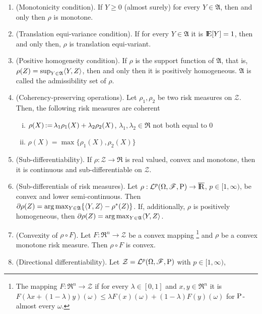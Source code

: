 \documentclass[a4paper,10pt]{article}
\begin{document}
\begin{enumerate}
 \item (Monotonicity condition). If $Y\geq 0$ (almost surely) for every $Y\in \mathfrak{A}$, 
       then and only then $\rho$ is monotone.
       
 \item (Translation equi-variance condition). If for every $Y\in\mathfrak{A}$ it is $\E[Y]=1$,
       then and only then, $\rho$ is translation equi-variant.
       
 \item (Positive homogeneity condition). If $\rho$ is the support function of $\mathfrak{A}$, 
       that is, $\rho(Z) = \sup_{Y\in\mathfrak{A}}\langle Y,Z\rangle$, then and only then it is positively homogeneous.
       $\mathfrak{A}$ is called the admissibility set of $\rho$.
       
 \item (Coherency-preserving operations). Let $\rho_1,\rho_2$ be two risk measures on $\mathcal{Z}$.
       Then, the following risk measures are coherent
       \begin{enumerate}[i.]
        \item $\rho(X) {}\mathop{\mathrel{:}=}{} \lambda_1\rho_1(X)+\lambda_2\rho_2(X)$, $\lambda_1,\lambda_2\in\Re$ not both equal to $0$
        \item $\rho(X) = \max\{\rho_1(X), \rho_2(X)\}$
       \end{enumerate}       
 \item (Sub-differentiability). If $\rho:\mathcal{Z}\to\Re$ is real valued, convex and monotone, 
       then it is continuous and sub-differentiable on $\mathcal{Z}$.
 \item (Sub-differentials of risk measures). Let $\rho:\mathcal{L}^p\ofp \to \barre$, $p\in [1,\infty)$,
        be convex and lower semi-continuous. Then $\partial \rho(Z) = \arg\max_{Y\in\mathfrak{A}} \{\langle Y,Z\rangle - \rho^*(Z)\}$.
        If, additionally, $\rho$ is positively homogeneous, then $\partial \rho(Z) = \arg\max_{Y\in\mathfrak{A}}\langle Y,Z\rangle$.
 \item (Convexity of $\rho\circ F$). Let $F:\Re^n\to\mathcal{Z}$ be a convex mapping%
       \footnote{The mapping $F:\Re^n\to\mathcal{Z}$ if for every $\lambda\in[0,1]$ and $x,y\in\Re^n$
                 it is $F(\lambda x + (1-\lambda)y)(\omega) \leq \lambda F(x)(\omega) + (1-\lambda)F(y)(\omega)$
                 for $\mathrm{P}$-almost every $\omega$.} and $\rho$ be a convex
       monotone risk measure. Then $\rho\circ F$ is convex. 
 \item (Directional differentiability). Let $\mathcal{Z}=\mathcal{L}^p(\Omega,\mathscr{F},\mathrm{P})$ with $p\in[1,\infty)$,

\end{enumerate}
\end{document}

